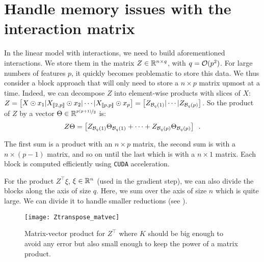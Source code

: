\documentclass[../main.tex]{subfiles}
\begin{document}

\section{Handle memory issues with the interaction matrix}\label{sec:memory}

In the linear model with interactions, we need to build aforementioned
interactions.
We store them in the matrix $Z\in \mathbb{R}^{n\times q}$, with $q=\mathcal{O}(p^2)$.
For large numbers of features $p$, it quickly becomes problematic to store
this data.
We thus consider a block approach that will only need to store a $n\times p$
matrix upmost at a time.
Indeed, we can decompose $Z$ into element-wise products with slices of $X$:
$Z=\begin{bmatrix}
		X \odot x_1 | X_{\llbracket 2,p \rrbracket} \odot x_2 |
		\cdots | X_{\llbracket p, p\rrbracket} \odot x_p
	\end{bmatrix}
	=\begin{bmatrix} Z_{\mathcal{B}_{q}(1)} |
		\cdots |Z_{\mathcal{B}_{q}(p)}
	\end{bmatrix}$.
So the product of $Z$ by a vector
$\Theta \in \mathbb{R}^{\nicefrac{p(p+1)}{2}}$ is:
 \[Z\Theta = \begin{bmatrix}
		Z_{\mathcal{B}_{q}(1)}\Theta_{\mathcal{B}_{q}(1)} +
		 \dots + Z_{\mathcal{B}_{q}(p)}\Theta_{\mathcal{B}_{q}(p)}\\
 \end{bmatrix} \enspace .\]

The first sum is a product with an $n\times p$ matrix,
the second sum is with a $n\times (p-1)$ matrix,
and so on until the last which is with a $n\times 1$ matrix.
Each block is computed efficiently using \texttt{CUDA} acceleration.

\medskip

For the product $Z^\top \xi$, $\xi\in\mathbb{R}^n$ (used in the gradient step),
we can also divide the blocks along the axis of size $q$.
Here, we sum over the axis of size $n$ which is quite large.
We can divide it to handle smaller reductions (see ).
\begin{figure}[htbp]
	\centering
	\texttt{[image: Ztranspose\_matvec]}
	\caption{Matrix-vector product for $Z^\top$ where $K$ should be big
	enough to avoid any error but
	also small enough to keep the power of a matrix product.}
	\label{fig:mat_trans}
\end{figure}
\end{document}
